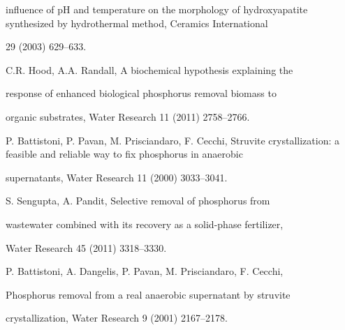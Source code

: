 \documentclass[a4paper,portrait,12pt]{article}
\begin{document}
\begin{flushleft}
inﬂuence of pH and temperature on the morphology of hydroxyapatite synthesized by hydrothermal method, Ceramics International
\end{flushleft}


29 (2003) 629--633.


\begin{flushleft}
[8] C.R. Hood, A.A. Randall, A biochemical hypothesis explaining the
\end{flushleft}


\begin{flushleft}
response of enhanced biological phosphorus removal biomass to
\end{flushleft}


\begin{flushleft}
organic substrates, Water Research 11 (2011) 2758--2766.
\end{flushleft}


\begin{flushleft}
[9] P. Battistoni, P. Pavan, M. Prisciandaro, F. Cecchi, Struvite crystallization: a feasible and reliable way to ﬁx phosphorus in anaerobic
\end{flushleft}


\begin{flushleft}
supernatants, Water Research 11 (2000) 3033--3041.
\end{flushleft}


\begin{flushleft}
[10] S. Sengupta, A. Pandit, Selective removal of phosphorus from
\end{flushleft}


\begin{flushleft}
wastewater combined with its recovery as a solid-phase fertilizer,
\end{flushleft}


\begin{flushleft}
Water Research 45 (2011) 3318--3330.
\end{flushleft}


\begin{flushleft}
[11] P. Battistoni, A. Dangelis, P. Pavan, M. Prisciandaro, F. Cecchi,
\end{flushleft}


\begin{flushleft}
Phosphorus removal from a real anaerobic supernatant by struvite
\end{flushleft}


\begin{flushleft}
crystallization, Water Research 9 (2001) 2167--2178.
\end{flushleft}
\end{document}
